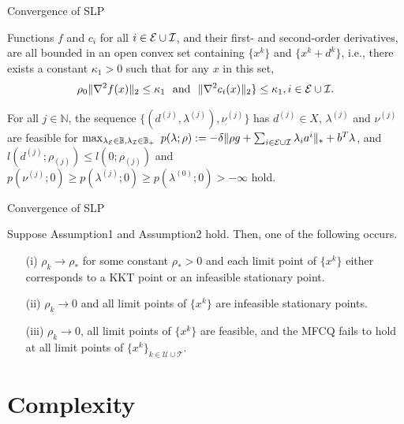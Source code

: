 \documentclass[8pt]{beamer}
\begin{document}
	\begin{frame}{Convergence of SLP}
		\begin{assumption}\label{ass.algorithm}
			Functions $f$ and $c_i$ for all $i \in {\cal E}\cup{\cal I}$, and their first- and second-order  derivatives, are all  bounded in an open convex set containing $\{x^k\}$ and $\{x^k+d^k\}$, i.e., there exists a constant  $\kappa_1>0$  such that  for any $x$ in this set, 
			\[  \rho_0\|\nabla^2f(x)\|_2 \le \kappa_1\ \text{  and  }\  \|\nabla^2c_i(x)\|_2 \} \le \kappa_1, i\in{\cal E}\cup{\cal I}.\] 
		\end{assumption}
		\vfill
		\begin{assumption}
			For all $j \in \mathbb{N}$, the sequence $\{(d^{(j)},\lambda^{(j)}), \nu^{(j)}\}$ has $d^{(j)} \in X$, $\lambda^{(j)}$ and $\nu^{(j)}$ are feasible for $\max_{\lambda_{{\cal E}} \in \mathbb{B}, \lambda_{{\cal I}}\in\mathbb{B}_+}\ p(\lambda; \rho):= -  \delta\|\rho g+\sum_{i\in{\cal E}\cup{\cal I}}\lambda_i a^i \|_* + b^T \lambda$,  and  $l(d^{(j)}; \rho_{(j)}) \leq l(0; \rho_{(j)}) $ and $p(\nu^{(j)}; 0) \geq p(\lambda^{(j)}; 0) \geq p(\lambda^{(0)}; 0) > - \infty$ hold.
		\end{assumption}
		\vfill
	\end{frame}

	\begin{frame}{Convergence of SLP}
		\vfill
		\begin{theorem}  Suppose Assumption1 and Assumption2 hold. Then, one of the following occurs.
		\begin{enumerate}
			\item[(i)]  $\rho_k \to \rho_*$ for some constant $\rho_*>0$ and each limit point of $\{x^k\}$ either corresponds to a KKT point or an infeasible stationary point.
			\item[(ii)] $\rho_k \to 0$ and all limit points of $\{x^k\}$ are infeasible stationary points.
			\item[(iii)]  $\rho_k \to 0$, all limit points of $\{x^k\}$ are feasible, and the MFCQ fails to hold at all limit points of $\{x^k\}_{k\in\mathcal{U} \cup\mathcal{T}}$.			
		\end{enumerate}\end{theorem}
	\end{frame}


\section{Complexity}
\end{document}
